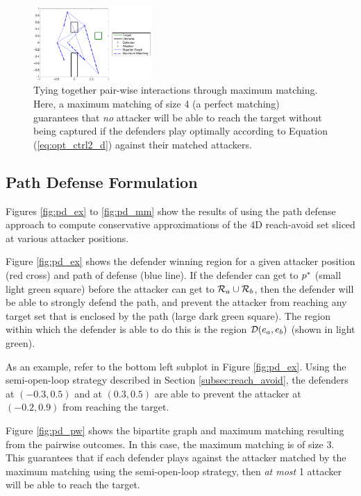 \begin{figure}
	\centering
	\includegraphics[width=0.4\textwidth]{"fig/OLGame_mm_results_HJI"}
	\caption{Tying together pair-wise interactions through maximum matching. Here, a maximum matching of size 4 (a perfect matching) guarantees that \textit{no} attacker will be able to reach the target without being captured if the defenders play optimally according to Equation (\ref{eq:opt_ctrl2_d}) against their matched attackers.}
	\label{fig:OL_mm_HJI}
\end{figure}

\subsection{Path Defense Formulation}
Figures \ref{fig:pd_ex} to \ref{fig:pd_mm} show the results of using the path defense approach to compute conservative approximations of the 4D reach-avoid set sliced at various attacker positions.

Figure \ref{fig:pd_ex} shows the defender winning region for a given attacker position (red cross) and path of defense (blue line). If the defender can get to $p^*$ (small light green square) before the attacker can get to $\mathcal{R}_a \cup \mathcal{R}_b$, then the defender will be able to strongly defend the path, and prevent the attacker from reaching any target set that is enclosed by the path (large dark green square). The region within which the defender is able to do this is the region $\mathcal{D}(e_a,e_b)$ (shown in light green). 

As an example, refer to the bottom left subplot in Figure \ref{fig:pd_ex}. Using the semi-open-loop strategy described in Section \ref{subsec:reach_avoid}, the defenders at $(-0.3, 0.5)$ and at $(0.3, 0.5)$ are able to prevent the attacker at $(-0.2, 0.9)$ from reaching the target.

Figure \ref{fig:pd_pw} shows the bipartite graph and maximum matching resulting from the pairwise outcomes. In this case, the maximum matching is of size 3. This guarantees that if each defender plays against the attacker matched by the maximum matching using the semi-open-loop strategy, then \textit{at most} 1 attacker will be able to reach the target.

